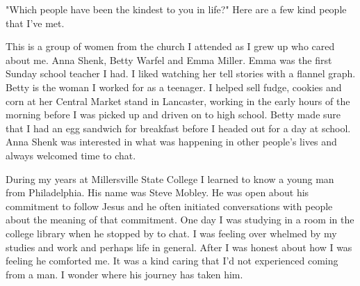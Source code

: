 "Which people have been the kindest to you in life?"
Here are a few kind people that I've met.

This is a group of women from the church I attended as I grew up who cared about me.
Anna Shenk, Betty Warfel and Emma Miller.
Emma was the first Sunday school teacher I had.
I liked watching her tell stories with a flannel graph.
Betty is the woman I worked for as a teenager.
I helped sell fudge, cookies and corn at her Central Market stand in Lancaster, working in the early hours of the morning before I was picked up and driven on to high school.
Betty made sure that I had an egg sandwich for breakfast before I headed out for a day at school.
Anna Shenk was interested in what was happening in other people's lives and always welcomed time to chat.

 During my years at Millersville State College I learned to know a young man from Philadelphia.
His name was Steve Mobley.
He was open about his commitment to follow Jesus and he often initiated conversations with people about the meaning of that commitment.
One day I was studying in a room in the college library when he stopped by to chat.
I was feeling over whelmed by my studies and work and perhaps life in general.
After I was honest about how I was feeling he comforted me.
It was a kind caring that I'd not experienced coming from a man.
I wonder where his journey has taken him.






